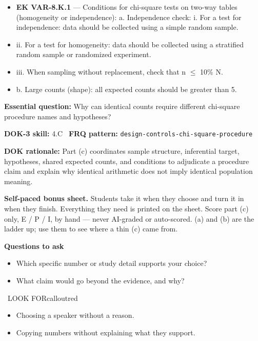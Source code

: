 \documentclass[11pt]{article}
\begin{document}
{\begin{itemize}[leftmargin=1.5em,itemsep=2pt,topsep=2pt]
  \item \textbf{EK VAR-8.K.1} --- Conditions for chi-square tests on two-way tables (homogeneity or independence): a. Independence check: i. For a test for independence: data should be collected using a simple random sample.
  \item ii. For a test for homogeneity: data should be collected using a stratified random sample or randomized experiment.
  \item iii. When sampling without replacement, check that n $\leq$ 10\% N.
  \item b. Large counts (shape): all expected counts should be greater than 5.
\end{itemize}
}
\textbf{Essential question:} Why can identical counts require different chi-square procedure names and hypotheses?\par
\textbf{DOK-3 skill:} 4.C \textperiodcentered\ \textbf{FRQ pattern:} {\small\texttt{design-\allowbreak{}controls-\allowbreak{}chi-\allowbreak{}square-\allowbreak{}procedure}}\par
\textbf{DOK rationale:} Part (c) coordinates sample structure, inferential target, hypotheses, shared expected counts, and conditions to adjudicate a procedure claim and explain why identical arithmetic does not imply identical population meaning.\par

\textbf{Self-paced bonus sheet.} Students take it when they choose and turn it in when they finish. Everything they need is printed on the sheet. Score part (c) only, E / P / I, by hand --- never AI-graded or auto-scored. (a) and (b) are the ladder up; use them to see where a thin (c) came from.\par

\textbf{Questions to ask}
\begin{itemize}[leftmargin=1.5em,itemsep=2pt,topsep=2pt]
  \item Which specific number or study detail supports your choice?
  \item What claim would go beyond the evidence, and why?
\end{itemize}

\begin{callout}{\IconWarn\ LOOK FOR}{calloutred}
\begin{itemize}[leftmargin=1.5em,itemsep=2pt,topsep=2pt]
  \item Choosing a speaker without a reason.
  \item Copying numbers without explaining what they support.
\end{itemize}
\end{callout}
\end{document}
